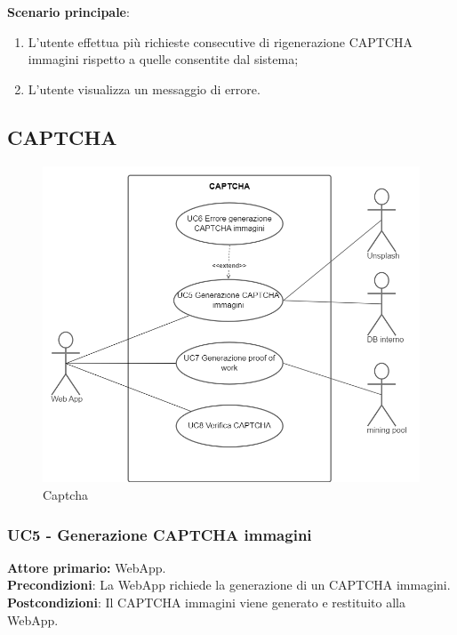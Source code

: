 \textbf{Scenario principale}:
\begin{enumerate}
    \item L'utente effettua più richieste consecutive di rigenerazione CAPTCHA immagini rispetto a quelle consentite dal sistema;
	\item L’utente visualizza un messaggio di errore.
\end{enumerate}

\subsection{CAPTCHA}

\begin{figure}[H]
    \centering
    \includegraphics[scale=0.4]{img/captcha.png}
    \caption{Captcha}
\end{figure}


\subsubsection{UC5 - Generazione CAPTCHA immagini}
\textbf{Attore primario:} WebApp.\\
\textbf{Precondizioni}: La WebApp richiede la generazione di un CAPTCHA immagini.\\
\textbf{Postcondizioni}: Il CAPTCHA immagini viene generato e restituito alla WebApp.\\

